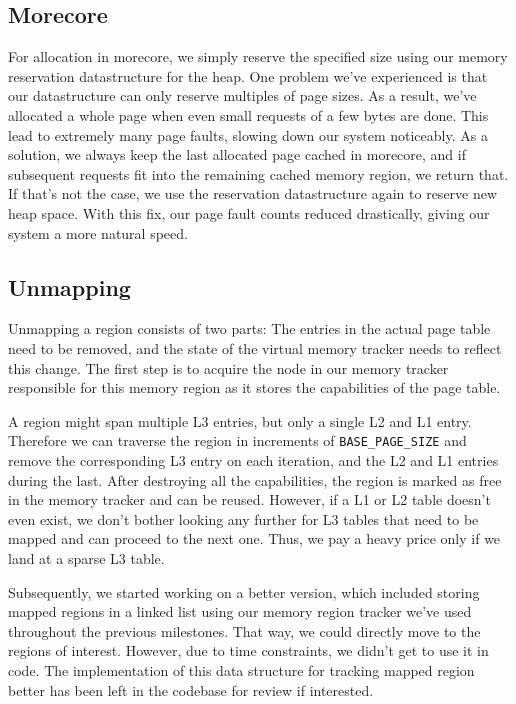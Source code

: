 \subsection{Morecore}
For allocation in morecore, we simply reserve the specified size using our memory reservation datastructure for the heap.
One problem we've experienced is that our datastructure can only reserve multiples of page sizes.
As a result, we've allocated a whole page when even small requests of a few bytes are done. This lead to extremely many
page faults, slowing down our system noticeably. As a solution, we always keep the last allocated page cached in morecore,
and if subsequent requests fit into the remaining cached memory region, we return that. If that's not the case, we use
the reservation datastructure again to reserve new heap space. With this fix, our page fault counts reduced drastically,
giving our system a more natural speed.

\subsection{Unmapping}
Unmapping a region consists of two parts: The entries in the actual page table need to be removed, and the state of the virtual memory tracker needs to reflect this change. The first step is to acquire the node in our memory tracker responsible for this memory region as it stores the capabilities of the page table.

A region might span multiple L3 entries, but only a single L2 and L1 entry. Therefore we can traverse the region in increments of \verb|BASE_PAGE_SIZE| and remove the corresponding L3 entry on each iteration, and the L2 and L1 entries during the last. After destroying all the capabilities, the region is marked as free in the memory tracker and can be reused.
However, if a L1 or L2 table doesn't even exist, we don't bother looking any further for L3 tables that need to be mapped and can proceed to the next one.
Thus, we pay a heavy price only if we land at a sparse L3 table.

Subsequently, we started working on a better version, which included storing mapped regions in a linked list using our memory region tracker we've
used throughout the previous milestones. That way, we could directly move to the regions of interest. However, due to time constraints, we didn't get
to use it in code. The implementation of this data structure for tracking mapped region better has been left in the codebase for review if interested.


